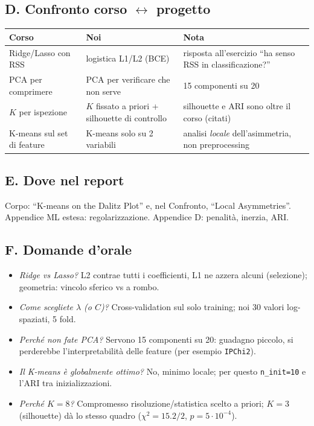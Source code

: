 \documentclass[11pt,a4paper]{article}
\newcommand{\code}[1]{\texttt{#1}}
\begin{document}
\subsection*{D. Confronto corso $\leftrightarrow$ progetto}
\begin{center}
\begin{tabular}{p{4.2cm}p{4.4cm}p{6.0cm}}
\toprule
Corso & Noi & Nota \\
\midrule
Ridge/Lasso con RSS & logistica L1/L2 (BCE) & risposta all'esercizio ``ha senso RSS in classificazione?'' \\
PCA per comprimere & PCA per verificare che non serve & 15 componenti su 20 \\
$K$ per ispezione & $K$ fissato a priori + silhouette di controllo & silhouette e ARI sono oltre il corso (citati) \\
K-means sul set di feature & K-means solo su 2 variabili & analisi \emph{locale} dell'asimmetria, non preprocessing \\
\bottomrule
\end{tabular}
\end{center}

\subsection*{E. Dove nel report}
Corpo: ``K-means on the Dalitz Plot'' e, nel Confronto, ``Local Asymmetries''. Appendice ML estesa: regolarizzazione. Appendice D: penalit\`a, inerzia, ARI.

\subsection*{F. Domande d'orale}
\begin{itemize}
\item \emph{Ridge vs Lasso?} L2 contrae tutti i coefficienti, L1 ne azzera alcuni (selezione); geometria: vincolo sferico vs a rombo.
\item \emph{Come scegliete $\lambda$ (o $C$)?} Cross-validation sul solo training; noi 30 valori log-spaziati, 5 fold.
\item \emph{Perch\'e non fate PCA?} Servono 15 componenti su 20: guadagno piccolo, si perderebbe l'interpretabilit\`a delle feature (per esempio \code{IPChi2}).
\item \emph{Il K-means \`e globalmente ottimo?} No, minimo locale; per questo \code{n\_init=10} e l'ARI tra inizializzazioni.
\item \emph{Perch\'e $K=8$?} Compromesso risoluzione/statistica scelto a priori; $K=3$ (silhouette) d\`a lo stesso quadro ($\chi^2=15.2/2$, $p=5\cdot10^{-4}$).
\end{itemize}
\end{document}
